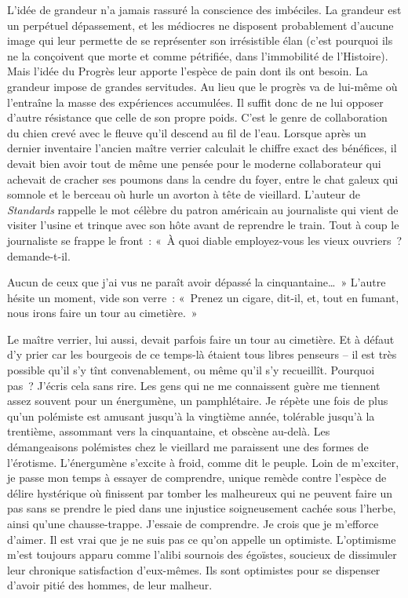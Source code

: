 \documentclass[french,twoside]{book} %
\begin{document}
\noindent L’idée de grandeur n’a jamais rassuré la conscience des imbéciles. La grandeur est un perpétuel dépassement, et les médiocres ne disposent probablement d’aucune image qui leur permette de se représenter son irrésistible élan (c’est pourquoi ils ne la conçoivent que morte et comme pétrifiée, dans l’immobilité de l’Histoire). Mais l’idée du Progrès leur apporte l’espèce de pain dont ils ont besoin. La grandeur impose de grandes servitudes. Au lieu que le progrès va de lui-même où l’entraîne la masse des expériences accumulées. Il suffit donc de ne lui opposer d’autre résistance que celle de son propre poids. C’est le genre de collaboration du chien crevé avec le fleuve qu’il descend au fil de l’eau. Lorsque après un dernier inventaire l’ancien maître verrier calculait le chiffre exact des bénéfices, il devait bien avoir tout de même une pensée pour le moderne collaborateur qui achevait de cracher ses poumons dans la cendre du foyer, entre le chat galeux qui somnole et le berceau où hurle un avorton à tête de vieillard. L’auteur de \emph{Standards} rappelle le mot célèbre du patron américain au journaliste qui vient de visiter l’usine et trinque avec son hôte avant de reprendre le train. Tout à coup le journaliste se frappe le front : « À quoi diable employez-vous les vieux ouvriers ? demande-t-il.\par
Aucun de ceux que j’ai vus ne paraît avoir dépassé la cinquantaine… » L’autre hésite un moment, vide son verre : « Prenez un cigare, dit-il, et, tout en fumant, nous irons faire un tour au cimetière. »\par
Le maître verrier, lui aussi, devait parfois faire un tour au cimetière. Et à défaut d’y prier car les bourgeois de ce temps-là étaient tous libres penseurs – il est très possible qu’il s’y tînt convenablement, ou même qu’il s’y recueillît. Pourquoi pas ? J’écris cela sans rire. Les gens qui ne me connaissent guère me tiennent assez souvent pour un énergumène, un pamphlétaire. Je répète une fois de plus qu’un polémiste est amusant jusqu’à la vingtième année, tolérable jusqu’à la trentième, assommant vers la cinquantaine, et obscène au-delà. Les démangeaisons polémistes chez le vieillard me paraissent une des formes de l’érotisme. L’énergumène s’excite à froid, comme dit le peuple. Loin de m’exciter, je passe mon temps à essayer de comprendre, unique remède contre l’espèce de délire hystérique où finissent par tomber les malheureux qui ne peuvent faire un pas sans se prendre le pied dans une injustice soigneusement cachée sous l’herbe, ainsi qu’une chausse-trappe. J’essaie de comprendre. Je crois que je m’efforce d’aimer. Il est vrai que je ne suis pas ce qu’on appelle un optimiste. L’optimisme m’est toujours apparu comme l’alibi sournois des égoïstes, soucieux de dissimuler leur chronique satisfaction d’eux-mêmes. Ils sont optimistes pour se dispenser d’avoir pitié des hommes, de leur malheur.\par
\end{document}
